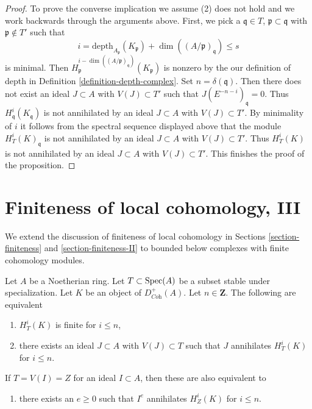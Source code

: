 \begin{proof}
\medskip\noindent
To prove the converse implication we assume (2) does not hold
and we work backwards through the arguments above. First, we pick a
$\mathfrak q \in T$, $\mathfrak p \subset \mathfrak q$
with $\mathfrak p \not \in T'$ such that
$$
i = \text{depth}_{A_\mathfrak p}(K_\mathfrak p) +
\dim((A/\mathfrak p)_\mathfrak q) \leq s
$$
is minimal. Then
$H^{i - \dim((A/\mathfrak p)_\mathfrak q)}_\mathfrak p(K_\mathfrak p)$
is nonzero by the our definition of depth in
Definition \ref{definition-depth-complex}.
Set $n = \delta(\mathfrak q)$. Then
there does not exist an ideal $J \subset A$ with $V(J) \subset T'$
such that $J(E^{-n - i})_\mathfrak q = 0$.
Thus $H^i_\mathfrak q(K_\mathfrak q)$ is not
annihilated by an ideal $J \subset A$ with $V(J) \subset T'$.
By minimality of $i$ it follows from the spectral sequence displayed above
that the module $H^i_T(K)_\mathfrak q$
is not annihilated by an ideal $J \subset A$
with $V(J) \subset T'$. Thus $H^i_T(K)$
is not annihilated by an ideal $J \subset A$
with $V(J) \subset T'$. This finishes the proof of the proposition.
\end{proof}







\section{Finiteness of local cohomology, III}
\label{section-finiteness-III}

\noindent
We extend the discussion of finiteness of local cohomology
in Sections \ref{section-finiteness} and \ref{section-finiteness-II}
to bounded below complexes with finite cohomology modules.

\begin{lemma}
\label{lemma-check-finiteness-local-cohomology-by-annihilator-complex}
Let $A$ be a Noetherian ring. Let $T \subset \mathop{\mathrm{Spec}}(A)$ be a subset stable
under specialization. Let $K$ be an object of $D_{\textit{Coh}}^+(A)$.
Let $n \in \mathbf{Z}$. The following are equivalent
\begin{enumerate}
\item $H^i_T(K)$ is finite for $i \leq n$,
\item there exists an ideal $J \subset A$ with $V(J) \subset T$
such that $J$ annihilates $H^i_T(K)$ for $i \leq n$.
\end{enumerate}
If $T = V(I) = Z$ for an ideal $I \subset A$, then these are also
equivalent to
\begin{enumerate}
\item[(3)] there exists an $e \geq 0$ such that $I^e$ annihilates
$H^i_Z(K)$ for $i \leq n$.
\end{enumerate}
\end{lemma}

